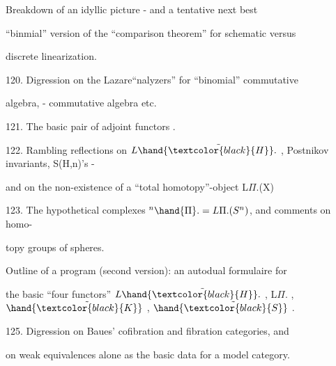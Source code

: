 \hand{\textcircled{\textcolor{black}{119.}}} Breakdown of an idyllic picture -  and a tentative next best\par
``binmial'' version of the ``comparison theorem'' for schematic versus\par
discrete linearization.\par

\margin{\{}120. Digression on the Lazare``nalyzers'' for ``binomial'' commutative\par
algebra, \hand{$\lambda$}- commutative algebra etc.\par

121. The basic pair of adjoint functors  .\par

122. Rambling reflections on $L\hand{\tilde{\textcolor{black}{H}}}.$ , Postnikov invariants, S(H,n)'s -\par
and on the non-existence of a ``total homotopy''-object L$\Pi$.(X) \par
{} \par

123. The hypothetical complexes $^{n}\hand{\Pi}. = L\Pi.(S^{n})$, and comments on homo-\par%
topy groups of spheres.\par

\hand{\textcircled{\textcolor{black}{124.}}} Outline of a program (second version): an autodual formulaire for\par
the basic ``four functors'' $L\hand{\tilde{\textcolor{black}{H}}}.$ , L$\Pi$. , $\hand{\tilde{\textcolor{black}{K}}}$ , $\hand{\tilde{\textcolor{black}{S}}}$ .\par

125. Digression on Baues' cofibration and fibration categories, and\par
on weak equivalences alone as the basic data for a model category.\par

